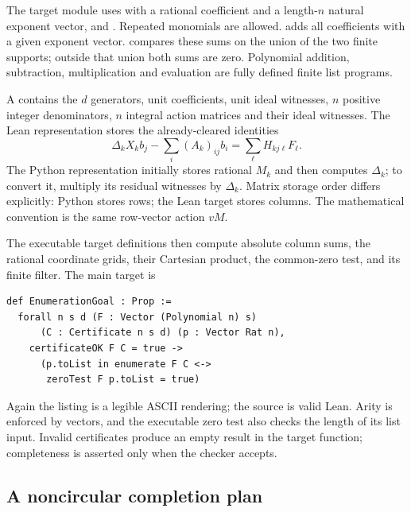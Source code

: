 The target module uses  with a rational coefficient
and a length-$n$ natural exponent vector, and
. Repeated monomials are
allowed.  adds all coefficients with a given
exponent vector.  compares these sums on the
union of the two finite supports; outside that union both sums are zero.
Polynomial addition, subtraction, multiplication and evaluation are
fully defined finite list programs.

A  contains the $d$ generators, unit
coefficients, unit ideal witnesses, $n$ positive integer denominators,
$n$ integral action matrices and their ideal witnesses. The Lean
representation stores the already-cleared identities
\[
 \Delta_kX_kb_j-\sum_i(A_k)_{ij}b_i
                     =\sum_\ell H_{kj\ell}F_\ell.
\]
The Python representation initially stores rational $M_k$ and then
computes $\Delta_k$; to convert it, multiply its residual witnesses
by $\Delta_k$. Matrix storage order differs explicitly: Python stores
rows; the Lean target stores columns. The mathematical convention is
the same row-vector action $vM$.

The executable target definitions then compute absolute column sums,
the rational coordinate grids, their Cartesian product, the common-zero
test, and its finite filter. The main target is
\begin{verbatim}
def EnumerationGoal : Prop :=
  forall n s d (F : Vector (Polynomial n) s)
      (C : Certificate n s d) (p : Vector Rat n),
    certificateOK F C = true ->
      (p.toList in enumerate F C <->
       zeroTest F p.toList = true)
\end{verbatim}
Again the listing is a legible ASCII rendering; the source is valid
Lean. Arity is enforced by vectors, and the executable zero test
also checks the length of its list input. Invalid certificates produce
an empty result in the target function; completeness is asserted only
when the checker accepts.

\subsection{A noncircular completion plan}

